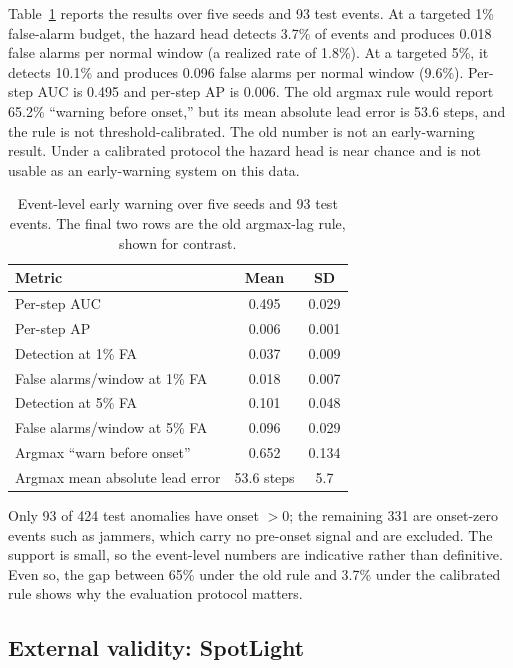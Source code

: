 \documentclass[conference]{IEEEtran}
\begin{document}
Table~\ref{tab:early} reports the results over five seeds and 93 test events. At a targeted 1\% false-alarm budget, the hazard head detects 3.7\% of events and produces 0.018 false alarms per normal window (a realized rate of 1.8\%). At a targeted 5\%, it detects 10.1\% and produces 0.096 false alarms per normal window (9.6\%). Per-step AUC is 0.495 and per-step AP is 0.006. The old argmax rule would report 65.2\% ``warning before onset,'' but its mean absolute lead error is 53.6 steps, and the rule is not threshold-calibrated. The old number is not an early-warning result. Under a calibrated protocol the hazard head is near chance and is not usable as an early-warning system on this data.

\begin{table}[t]
\centering
\caption{Event-level early warning over five seeds and 93 test events. The final two rows are the old argmax-lag rule, shown for contrast.}
\label{tab:early}
\footnotesize
\begin{tabular}{lcc}
\toprule
Metric & Mean & SD \\
\midrule
Per-step AUC & 0.495 & 0.029 \\
Per-step AP & 0.006 & 0.001 \\
Detection at 1\% FA & 0.037 & 0.009 \\
False alarms/window at 1\% FA & 0.018 & 0.007 \\
Detection at 5\% FA & 0.101 & 0.048 \\
False alarms/window at 5\% FA & 0.096 & 0.029 \\
\midrule
Argmax ``warn before onset'' & 0.652 & 0.134 \\
Argmax mean absolute lead error & 53.6 steps & 5.7 \\
\bottomrule
\end{tabular}
\end{table}

Only 93 of 424 test anomalies have onset $>0$; the remaining 331 are onset-zero events such as jammers, which carry no pre-onset signal and are excluded. The support is small, so the event-level numbers are indicative rather than definitive. Even so, the gap between 65\% under the old rule and 3.7\% under the calibrated rule shows why the evaluation protocol matters.

\subsection{External validity: SpotLight}
\end{document}
